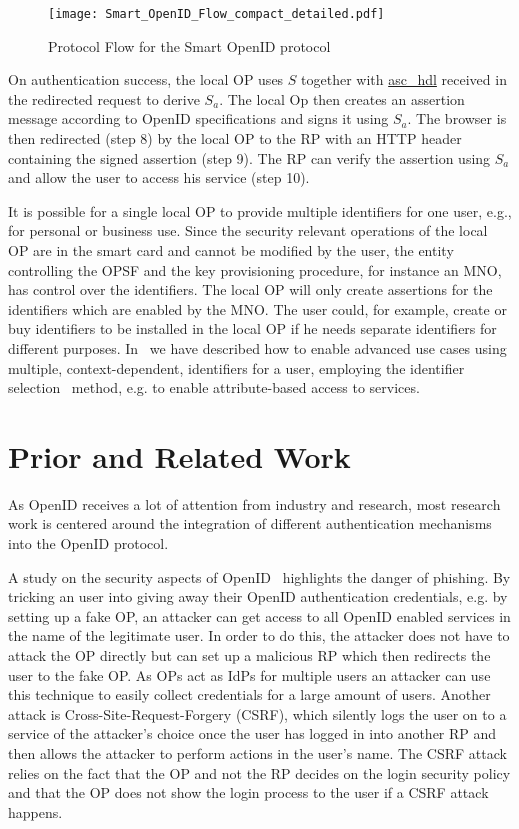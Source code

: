 \documentclass[runningheads,a4paper]{llncs}
\begin{document}
\begin{figure}[t]
 \centering
 \texttt{[image: Smart\_OpenID\_Flow\_compact\_detailed.pdf]}
 \caption{Protocol Flow for the Smart OpenID protocol}
 \label{fig:SmartOpenIDprotocol}
\end{figure}

On authentication success, the local OP uses  $S$ together with \url{asc_hdl} received in the redirected request to derive $S_a$. The local Op then creates an assertion message according to OpenID specifications and signs it using $S_a$.
The browser is then redirected (step 8) by the local OP to the RP with an HTTP header containing the signed assertion (step 9). The RP can verify the assertion using $S_a$ and allow the user to access his service (step 10).

It is possible for a single local OP to provide multiple identifiers for one user, e.g., for personal or business use.
Since the security relevant operations of the local OP are in the smart card and cannot be modified by the user, the entity controlling the OPSF and the key provisioning procedure, for instance an MNO, has control over the identifiers.
The local OP will only create assertions for the identifiers which are enabled by the MNO.
The user could, for example, create or buy identifiers to be installed in the local OP if he needs separate identifiers for different purposes. In~\cite{SmartOpenIDIFIP12} we have described how to enable advanced use cases using multiple, context-dependent, identifiers for a user, employing the identifier selection~\cite[sec. 10]{OpenIDSpecs} method, e.g. to enable attribute-based access to services.

\section{Prior and Related Work}
\label{sec:related}
As OpenID receives a lot of attention from industry and research, 
most research work is centered around the integration of different authentication mechanisms into the OpenID protocol.

A study on the security aspects of OpenID~\cite{Tsyrklevich2007} highlights the danger of phishing.
By tricking an user into giving away their OpenID authentication credentials, e.g. by setting up a fake OP, an attacker can get access to all OpenID enabled services in the name of the legitimate user. 
In order to do this, the attacker does not have to attack the OP directly but can set up a malicious RP which then redirects the user to the fake OP.
As OPs act as IdPs for multiple users an attacker can use this technique to easily collect credentials for a large amount of users.
Another attack is Cross-Site-Request-Forgery (CSRF), which silently logs the user on to a service of the attacker's choice once the user has logged in into another RP and then allows the attacker to perform actions in the user's name.
The CSRF attack relies on the fact that the OP and not the RP decides on the  login security policy and that the OP does not show the login process to the user if a CSRF attack happens.
\end{document}
